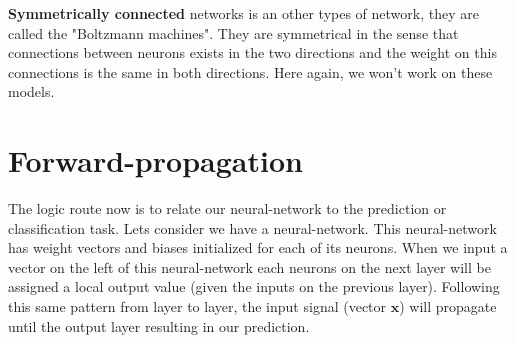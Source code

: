 		\textbf{Symmetrically connected} networks is an other types of network, they are called the "Boltzmann machines". They are symmetrical in the sense that connections between neurons exists in the two directions and the weight on this connections is the same in both directions. Here again, we won't work on these models.


	\section{Forward-propagation}
	\label{sec:forward_propagation}
		The logic route now is to relate our neural-network to the prediction or classification task. Lets consider we have a neural-network. This neural-network has weight vectors and biases initialized for each of its neurons. When we input a vector on the left of this neural-network each neurons on the next layer will be assigned a local output value (given the inputs on the previous layer). Following this same pattern from layer to layer, the input signal (vector $\boldsymbol{x}$) will propagate until the output layer resulting in our prediction.

